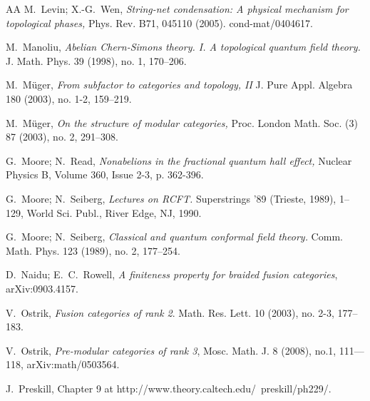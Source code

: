 \documentclass[12pt,psamsfonts]{amsart}
\numberwithin{equation}{section}
\theoremstyle{definition}
\begin{document}
\begin{thebibliography}{AA}
M.\ Levin; X.-G.\ Wen, \emph{String-net condensation: A physical mechanism for topological
phases,} Phys. Rev. B71, 045110 (2005). cond-mat/0404617.

 M.\ Manoliu, \emph{Abelian Chern-Simons theory. I. A topological quantum field theory.}
 J. Math. Phys. 39 (1998), no. 1, 170--206.


 M.\ M\"uger, \emph{From subfactor to categories and topology, II}
J. Pure Appl. Algebra 180 (2003), no. 1-2, 159--219.

 M.\ M\"uger, \emph{On the structure of modular categories,}
Proc. London Math. Soc. (3) 87 (2003), no. 2, 291--308.


G.\ Moore; N.\ Read, \emph{Nonabelions in the fractional quantum hall
effect,} Nuclear Physics B, Volume 360, Issue 2-3, p. 362-396.

 G.\ Moore; N.\ Seiberg, \emph{Lectures on RCFT.}
Superstrings '89 (Trieste, 1989), 1--129, World Sci. Publ., River
Edge, NJ, 1990.

 G.\ Moore; N.\ Seiberg, \emph{Classical and quantum conformal field theory.}
 Comm. Math. Phys. 123 (1989), no. 2, 177--254.



 D.\ Naidu; E.\ C.\ Rowell, \emph{A finiteness property
for braided fusion categories}, arXiv:0903.4157.

 V.\ Ostrik, \emph{Fusion categories of rank 2}. Math. Res. Lett. 10 (2003), no. 2-3, 177--183.

 V.\ Ostrik, \emph{Pre-modular categories of rank
3}, Mosc. Math. J. 8 (2008), no.1, 111---118, arXiv:math/0503564.

 J.\ Preskill, Chapter 9 at
 http://www.theory.caltech.edu/~preskill/ph229/.


\end{thebibliography}
\end{document}
